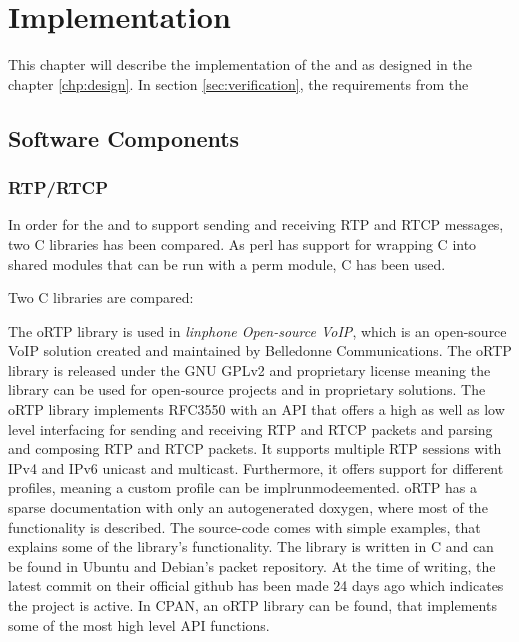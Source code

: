 \chapter{Implementation} \label{chp:implementation}
This chapter will describe the implementation of the \pub{} and \sub{} as designed in the chapter \ref{chp:design}. In section \ref{sec:verification}, the requirements from the 

\section{Software Components}
\subsection{RTP/RTCP}


In order for the \pub{} and \sub{} to support sending and receiving RTP and RTCP messages, two C libraries has been compared. As perl has support for wrapping C into shared modules that can be run with a perm module, C has been used.

Two C libraries are compared:

The oRTP library is used in \textit{linphone Open-source VoIP}, which is an open-source VoIP solution created and maintained by Belledonne Communications. The oRTP library is released under the GNU GPLv2 and proprietary license meaning the library can be used for open-source projects and in proprietary solutions.
The oRTP library implements RFC3550 with an API that offers a high as well as low level interfacing for sending and receiving RTP and RTCP packets and parsing and composing RTP and RTCP packets. It supports multiple RTP sessions with IPv4 and IPv6 unicast and multicast. Furthermore, it offers support for different profiles, meaning a custom profile can be implrunmodeemented.  oRTP has a sparse documentation with only an autogenerated doxygen, where most of the functionality is described. The source-code comes with simple examples, that explains some of the library's functionality. The library is written in C and can be found in Ubuntu and Debian's packet repository. At the time of writing, the latest commit on their official github has been made 24 days ago which indicates the project is active. In CPAN, an oRTP library can be found, that implements some of the most high level API functions.


